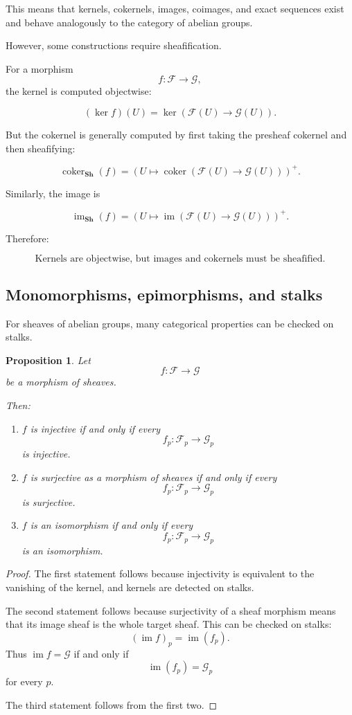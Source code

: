 \documentclass[12pt,a4paper]{article}
\DeclareMathOperator{\im}{im}
\DeclareMathOperator{\coker}{coker}
\newcommand{\Sh}{\mathbf{Sh}}
\theoremstyle{notespace}
\newtheorem{proposition}[definition]{Proposition}
\begin{document}
This means that kernels, cokernels, images, coimages, and exact sequences exist
and behave analogously to the category of abelian groups.

However, some constructions require sheafification.

For a morphism
\[
f:\mathcal F\to\mathcal G,
\]
the kernel is computed objectwise:

\[
(\ker f)(U)
=
\ker
\left(
\mathcal F(U)\to\mathcal G(U)
\right).
\]

But the cokernel is generally computed by first taking the presheaf cokernel
and then sheafifying:

\[
\coker_{\Sh}(f)
=
\left(
U \longmapsto
\coker
\left(
\mathcal F(U)\to\mathcal G(U)
\right)
\right)^+.
\]

Similarly, the image is

\[
\im_{\Sh}(f)
=
\left(
U \longmapsto
\im
\left(
\mathcal F(U)\to\mathcal G(U)
\right)
\right)^+.
\]

Therefore:

\[
\boxed{
	\text{Kernels are objectwise, but images and cokernels must be sheafified.}
}
\]

\subsection{Monomorphisms, epimorphisms, and stalks}
For sheaves of abelian groups, many categorical properties can be checked on
stalks.

\begin{proposition}
	Let
	\[
	f:\mathcal F\to\mathcal G
	\]
	be a morphism of sheaves.
	
	Then:
	
	\begin{enumerate}
		\item $f$ is injective if and only if every
		\[
		f_p:\mathcal F_p\to\mathcal G_p
		\]
		is injective.
		
		\item $f$ is surjective as a morphism of sheaves if and only if every
		\[
		f_p:\mathcal F_p\to\mathcal G_p
		\]
		is surjective.
		
		\item $f$ is an isomorphism if and only if every
		\[
		f_p:\mathcal F_p\to\mathcal G_p
		\]
		is an isomorphism.
	\end{enumerate}
\end{proposition}

\begin{proof}
	The first statement follows because injectivity is equivalent to the vanishing
	of the kernel, and kernels are detected on stalks.
	
	The second statement follows because surjectivity of a sheaf morphism means
	that its image sheaf is the whole target sheaf.
	This can be checked on stalks:
	\[
	(\im f)_p=\im(f_p).
	\]
	Thus $\im f=\mathcal G$ if and only if
	\[
	\im(f_p)=\mathcal G_p
	\]
	for every $p$.
	
	The third statement follows from the first two.
\end{proof}
\end{document}
